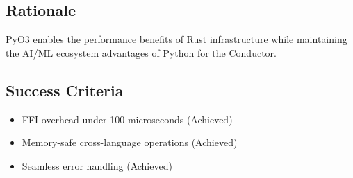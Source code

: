\subsection*{Rationale}

PyO3 enables the performance benefits of Rust infrastructure while maintaining the AI/ML ecosystem advantages of Python for the Conductor.

\subsection*{Success Criteria}

\begin{itemize}
\item FFI overhead under 100 microseconds (Achieved)
\item Memory-safe cross-language operations (Achieved)
\item Seamless error handling (Achieved)
\end{itemize}
